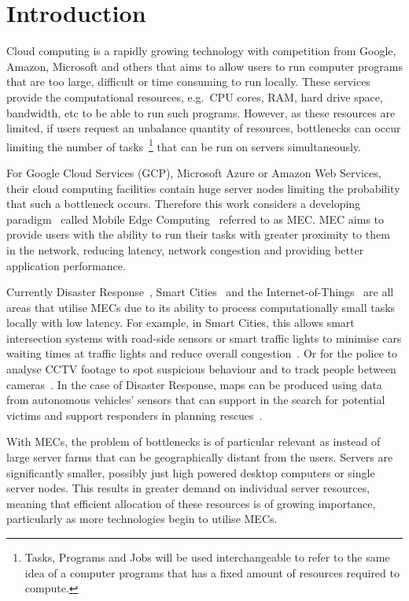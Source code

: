 \chapter{Introduction}
\label{ch:introduction}
Cloud computing is a rapidly growing technology with competition from Google, Amazon, Microsoft and others that aims to
allow users to run computer programs that are too large, difficult or time consuming to run locally.
These services provide the computational resources, e.g.\ CPU cores, RAM, hard drive space, bandwidth, etc
to be able to run such programs. However, as these resources are limited, if users request an unbalance quantity of
resources, bottlenecks can occur limiting the number of tasks~\footnote{Tasks, Programs and Jobs will be used
interchangeable to refer to the same idea of a computer programs that has a fixed amount of resources required to
compute.} that can be run on servers simultaneously.

For Google Cloud Services (GCP), Microsoft Azure or Amazon Web Services, their cloud computing facilities contain huge
server nodes limiting the probability that such a bottleneck occurs.
Therefore this work considers a developing paradigm~\citep{mobile_edge_survey} called Mobile Edge
Computing~\citep{hu2015mobile} referred to as MEC. MEC aims to provide users with the ability to run their
tasks with greater proximity to them in the network, reducing latency, network congestion and providing better
application performance.

Currently Disaster Response~\citep{mobile_edge_disaster}, Smart Cities~\citep{smart_disaster_management} and the
Internet-of-Things~\citep{mobile_edge_IoT} are all areas that utilise MECs due to its ability
to process computationally small tasks locally with low latency. For example, in Smart Cities, this
allows smart intersection systems with road-side sensors or smart traffic lights to minimise cars waiting times
at traffic lights and reduce overall congestion~\citep{smart_cities_traffic_lights}. Or for the
police to analyse CCTV footage to spot suspicious behaviour and to track people between cameras~\citep{Sreenu2019}.
In the case of Disaster Response, maps can be produced using data from autonomous vehicles' sensors that can support in
the search for potential victims and support responders in planning rescues~\citep{smart_disaster_management}.

With MECs, the problem of bottlenecks is of particular relevant as instead of large server
farms that can be geographically distant from the users. Servers are significantly smaller, possibly
just high powered desktop computers or single server nodes. This results in greater demand on individual server
resources, meaning that efficient allocation of these resources is of growing importance, particularly as more
technologies begin to utilise MECs.

